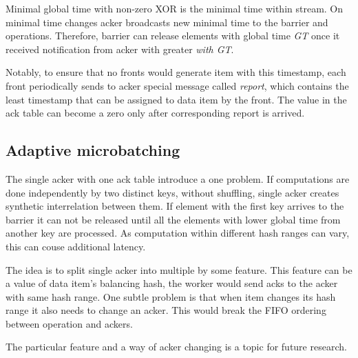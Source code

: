 Minimal global time with non-zero XOR is the minimal time within stream. On minimal time changes acker broadcasts new minimal time to the barrier and operations. Therefore, barrier can release elements with global time {\it GT} once it received notification from acker with greater {\it with GT}.

Notably, to ensure that no fronts would generate item with this timestamp, each front periodically sends to acker special message called {\it report}, which contains the least timestamp that can be assigned to data item by the front. The value in the ack table can become a zero only after corresponding report is arrived.  

\subsection{Adaptive microbatching}
The single acker with one ack table introduce a one problem. If computations are done independently by two distinct keys, without shuffling, single acker creates synthetic interrelation between them. If element with the first key arrives to the barrier it can not be released until all the elements with lower global time from another key are processed. As computation within different hash ranges can vary, this can couse additional latency.

The idea is to split single acker into multiple by some feature. This feature can be a value of data item's balancing hash, the worker would send acks to the acker with same hash range. One subtle problem is that when item changes its hash range it also needs to change an acker. This would break the FIFO ordering between operation and ackers. 

The particular feature and a way of acker changing is a topic for future research.
